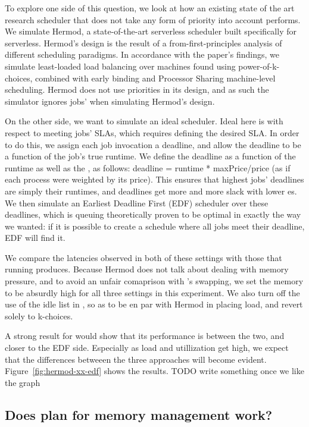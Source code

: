 To explore one side of this question, we look at how an existing state of the
art research scheduler that does not take any form of priority into account
performs. We simulate Hermod\cite{TODO}, a state-of-the-art serverless scheduler
built specifically for serverless. Hermod's design is the result of a
from-first-principles analysis of different scheduling paradigms. In accordance
with the paper's findings, we simulate least-loaded load balancing over machines
found using power-of-k-choices, combined with early binding and Processor
Sharing machine-level scheduling. Hermod does not use priorities in its design,
and as such the simulator ignores jobs' \class{} when simulating Hermod's
design.


On the other side, we want to simulate an ideal scheduler. Ideal here is with
respect to meeting jobs' SLAs, which requires defining the desired SLA. In order
to do this, we assign each job invocation a deadline, and allow the deadline to
be a function of the job's true runtime. We define the deadline as a function of
the runtime as well as the \priceclass{}, as follows: deadline = runtime *
maxPrice/price (as if each process were weighted by its price). This ensures
that highest \class{} jobs' deadlines are simply their runtimes, and deadlines
get more and more slack with lower \class{}es. We then simulate an Earliest
Deadline First (EDF) scheduler over these deadlines, which is queuing
theoretically proven to be optimal in exactly the way we wanted: if it is
possible to create a schedule where all jobs meet their deadline, EDF will find
it\cite{TODO}.

We compare the latencies observed in both of these settings with those that
running \sys{} produces. Because Hermod does not talk about dealing with memory
pressure, and to avoid an unfair comaprison with \sys{}'s swapping, we set the
memory to be absurdly high for all three settings in this experiment. We also
turn off the use of the idle list in \sys{}, so as to be en par with Hermod in
placing load, and revert solely to k-choices.

A strong result for \sys{} would show that its performance is between the two,
and closer to the EDF side. Especially as load and utillization get high, we
expect that the differences betweeen the three approaches will become evident.
Figure~\ref{fig:hermod-xx-edf} shows the results. TODO write something once we
like the graph


\subsection{Does \sys{} plan for memory management work?}

